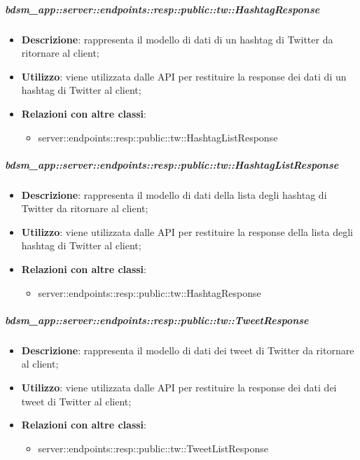     \subparagraph{bdsm\_app::server::endpoints::resp::public::tw::HashtagResponse} %
    \label{subp:bdsm_app_server_endpoints_resp_public_tw_hashtagresponse}
    \begin{itemize}
      \item \textbf{Descrizione}: rappresenta il modello di dati di un hashtag di Twitter da ritornare al client;
      \item \textbf{Utilizzo}: viene utilizzata dalle API per restituire la response dei dati di un hashtag di Twitter al client;
      \item \textbf{Relazioni con altre classi}:
        \begin{itemize}
          \item server::endpoints::resp::public::tw::HashtagListResponse
        \end{itemize}
      \end{itemize}
    
    \subparagraph{bdsm\_app::server::endpoints::resp::public::tw::HashtagListResponse} %
    \label{subp:bdsm_app_server_endpoints_resp_public_tw_hashtaglistresponse}
    \begin{itemize}
      \item \textbf{Descrizione}: rappresenta il modello di dati della lista degli hashtag di Twitter da ritornare al client;
      \item \textbf{Utilizzo}: viene utilizzata dalle API per restituire la response della lista degli hashtag di Twitter al client;
      \item \textbf{Relazioni con altre classi}:
        \begin{itemize}
          \item server::endpoints::resp::public::tw::HashtagResponse
        \end{itemize}
      \end{itemize}
    
    \subparagraph{bdsm\_app::server::endpoints::resp::public::tw::TweetResponse} %
    \label{subp:bdsm_app_server_endpoints_resp_public_tw_tweetresponse}
    \begin{itemize}
      \item \textbf{Descrizione}: rappresenta il modello di dati dei tweet di Twitter da ritornare al client;
      \item \textbf{Utilizzo}: viene utilizzata dalle API per restituire la response dei dati dei tweet di Twitter al client;
      \item \textbf{Relazioni con altre classi}:
        \begin{itemize}
          \item server::endpoints::resp::public::tw::TweetListResponse
        \end{itemize}
      \end{itemize}
    
